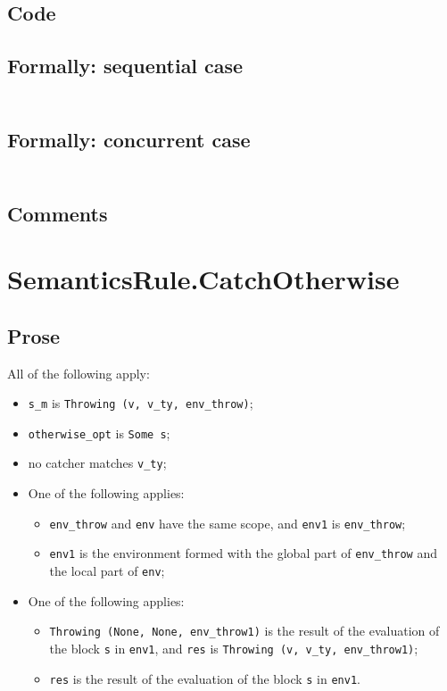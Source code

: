 \documentclass{book}
\begin{document}
  \subsection{Code}

  \subsection{Formally: sequential case}
  \begin{align}
  \end{align} 

  \subsection{Formally: concurrent case}
  \begin{align}
  \end{align} 

    \subsection{Comments}

\section{SemanticsRule.CatchOtherwise \label{sec:SemanticsRule.CatchOtherwise}}

    \subsection{Prose}
    All of the following apply:
    \begin{itemize}
    \item \texttt{s\_m} is \texttt{Throwing (v, v\_ty, env\_throw)};
    \item \texttt{otherwise\_opt} is \texttt{Some s};
    \item no catcher matches \texttt{v\_ty};
    \item One of the following applies:
      \begin{itemize}
      \item \texttt{env\_throw} and \texttt{env} have the same scope, and \texttt{env1} is \texttt{env\_throw};
      \item \texttt{env1} is the environment formed with the global part of \texttt{env\_throw}
        and the local part of \texttt{env};
      \end{itemize}
    \item One of the following applies:
      \begin{itemize}
      \item \texttt{Throwing (None, None, env\_throw1)} is the result of the evaluation of
        the block \texttt{s} in \texttt{env1}, and \texttt{res} is \texttt{Throwing (v, v\_ty, env\_throw1)};
      \item \texttt{res} is the result of the evaluation of the block \texttt{s} in \texttt{env1}.
      \end{itemize}
    \end{itemize}
\end{document}
